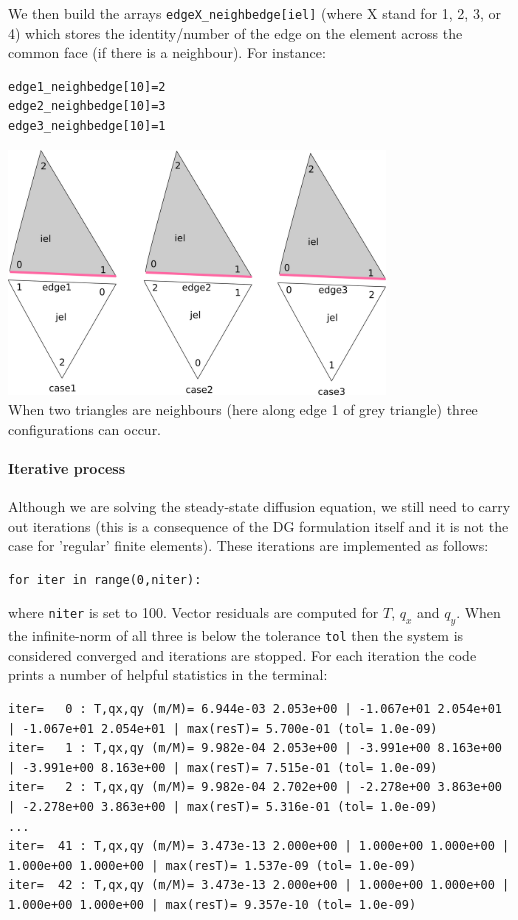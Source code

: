 We then build the arrays {\tt edgeX\_neighbedge[iel]} (where X stand for 1, 2, 3, 
or 4) which stores the identity/number of the edge on the element across the common face
(if there is a neighbour).
For instance:
\begin{lstlisting}
edge1_neighbedge[10]=2
edge2_neighbedge[10]=3
edge3_neighbedge[10]=1
\end{lstlisting}


\begin{center}
\includegraphics[width=10cm]{python_codes/fieldstone_79/images/drawing}\\
{\captionfont When two triangles are neighbours (here along edge 1
of grey triangle) three configurations can occur.}
\end{center}





\paragraph{Iterative process}
Although we are solving the steady-state diffusion equation, we still need to carry out 
iterations (this is a consequence of the DG formulation itself and it is not the 
case for 'regular' finite elements).
These iterations are implemented as follows:
\begin{lstlisting}
for iter in range(0,niter):
\end{lstlisting}
where {\tt niter} is set to 100. Vector residuals are computed for $T$, $q_x$ and $q_y$. When the
infinite-norm of all three is below the tolerance {\tt tol} then the system is considered 
converged and iterations are stopped.   
For each iteration the code prints a number of helpful statistics in the terminal:
\begin{scriptsize}
\begin{verbatim}
iter=   0 : T,qx,qy (m/M)= 6.944e-03 2.053e+00 | -1.067e+01 2.054e+01 | -1.067e+01 2.054e+01 | max(resT)= 5.700e-01 (tol= 1.0e-09)
iter=   1 : T,qx,qy (m/M)= 9.982e-04 2.053e+00 | -3.991e+00 8.163e+00 | -3.991e+00 8.163e+00 | max(resT)= 7.515e-01 (tol= 1.0e-09)
iter=   2 : T,qx,qy (m/M)= 9.982e-04 2.702e+00 | -2.278e+00 3.863e+00 | -2.278e+00 3.863e+00 | max(resT)= 5.316e-01 (tol= 1.0e-09)
...
iter=  41 : T,qx,qy (m/M)= 3.473e-13 2.000e+00 | 1.000e+00 1.000e+00 | 1.000e+00 1.000e+00 | max(resT)= 1.537e-09 (tol= 1.0e-09)
iter=  42 : T,qx,qy (m/M)= 3.473e-13 2.000e+00 | 1.000e+00 1.000e+00 | 1.000e+00 1.000e+00 | max(resT)= 9.357e-10 (tol= 1.0e-09)
\end{verbatim}
\end{scriptsize}

